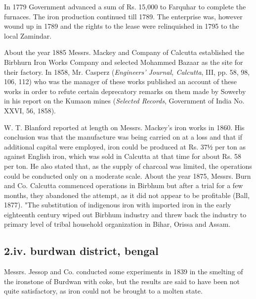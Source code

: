 In 1779 Government advanced a sum of Rs. 15,000 to Farquhar to complete the furnaces.  The iron production continued till 1789.  The enterprise was, however wound up in 1789 and the rights to the lease were relinquished in 1795 to the local Zamindar.

About the year 1885 Messrs. Mackey and Company of Calcutta established the Birbhurn Iron Works Company and selected Mohammed Bazaar as the site for their factory. In 1858, Mr. Casperz ({\it Engineers’ Journal, Calcutta}, III, pp. 58, 98, 106, 112) who was the manager of these works published an account of these works in order to refute certain deprecatory remarks on them made by Sowerby in his report on the Kumaon mines ({\it Selected Records}, Government of India No. XXVI, 56, 1858).

W. T. Blanford reported at length on Messrs. Mackey’s iron works in 1860. His conclusion was that the manufacture was being carried on at a loss and that if additional capital were employed, iron could be produced at Rs. $37½$ per ton as against English iron, which was sold in Calcutta at that time for about Rs. 58 per ton. He also stated that, as the supply of charcoal was limited, the operations could be conducted only on a moderate scale. About the year 1875, Messrs. Burn and Co. Calcutta commenced operations in Birbhum but after a trial for a few months, they abandoned the attempt, as it did not appear to be profitable (Ball, 1877). "The substitution of indigenous iron with imported iron in the early eighteenth century wiped out Birbhum industry and threw back the industry to primary level of tribal household organization in Bihar, Orissa and Assam.

\subsection*{2.iv.  burdwan district, bengal}

Messrs. Jessop and Co. conducted some experiments in 1839 in the smelting of the ironstone of Burdwan with coke, but the results are said to have been not quite satisfactory, as iron could not be brought to a molten state. 

